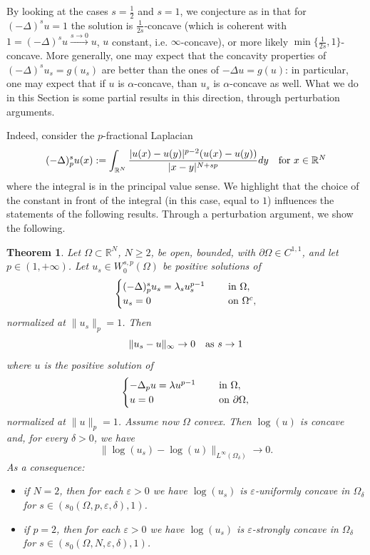 \documentclass[11pt, reqno]{amsart}
\newtheorem{theorem}[lemma]{Theorem}
\theoremstyle{definition}
\numberwithin{equation}{section}
\newcommand{\R}{\mathbb{R}}
\def\eps{\varepsilon}
\def\norm#1{\|#1\|}
\begin{document}
By looking at the cases $s=\frac{1}{2}$ and $s=1$, we conjecture as in \cite{Kul17} that for $(-\Delta)^s u = 1$ the solution is $\frac{1}{2s}$-concave (which is coherent with $1=(-\Delta)^s u \stackrel{s \to 0} \to u$, $u$ constant, i.e. $\infty$-concave), or more likely $\min\{\frac{1}{2s},1\}$-concave. 
More generally, one may expect that the concavity properties of $(-\Delta)^s u_s =g(u_s)$ are better than the ones of $-\Delta u = g(u)$: in particular, one may expect that if $u$ is $\alpha$-concave, than $u_s$ is $\alpha$-concave as well. 
What we do in this Section is some partial results in this direction, through perturbation arguments.
 
Indeed, consider the $p$-fractional Laplacian 
$$(-\Delta)^s_p u(x):= \int_{\R^N} \frac{|u(x)-u(y)|^{p-2} (u(x)-u(y))}{|x-y|^{N+sp}} dy \quad \hbox{for $x \in \R^N$}$$
where the integral is in the principal value sense.
We highlight that the choice of the constant in front of the integral (in this case, equal to $1$) influences the statements of the following results.
Through a perturbation argument, we show the following.
\begin{theorem}
\label{thm_fractional_log}
Let $\Omega \subset \R^N$, $N\geq 2$, be open, bounded, with $\partial \Omega \in C^{1,1}$, and let $p\in (1,+\infty)$. 
Let $u_s\in W^{s,p}_0(\Omega)$ be positive solutions of
$$\begin{cases}
(-\Delta)^s_p u_s = \lambda_s u_s^{p-1} & \quad \hbox{ in $\Omega$},\\ 
u_s =0 & \quad \hbox{ on $\Omega^c$},
\end{cases}$$
normalized at $\norm{u_s}_p=1$. 
Then 
$$\norm{u_{s} - u}_{\infty} \to 0 \quad \hbox{as $s \to 1$}$$
where $u$ is the positive solution of
$$\begin{cases}
-\Delta_p u = \lambda u^{p-1} & \quad \hbox{ in $\Omega$},\\ 
u =0 & \quad \hbox{ on $\partial \Omega$},
\end{cases}$$
normalized at $\norm{u}_p=1$.
Assume now $\Omega$ convex. Then $\log(u)$ is concave and, for every $\delta>0$, we have
$$\norm{\log(u_{s}) - \log(u)}_{L^{\infty}(\Omega_{\delta})} \to 0.$$
As a consequence:
\begin{itemize}
\item if $N=2$, then for each $\eps>0$ we have $\log(u_s)$ is $\eps$-uniformly concave in $\Omega_{\delta}$ for $s \in (s_0( \Omega, p,\eps,\delta), 1)$.
\item if $p=2$, then for each $\eps>0$ we have $\log(u_s)$ is $\eps$-strongly concave in $\Omega_{\delta}$ for $s \in (s_0(\Omega,N, \eps,\delta), 1)$.
 \end{itemize}
\end{theorem}
\end{document}
